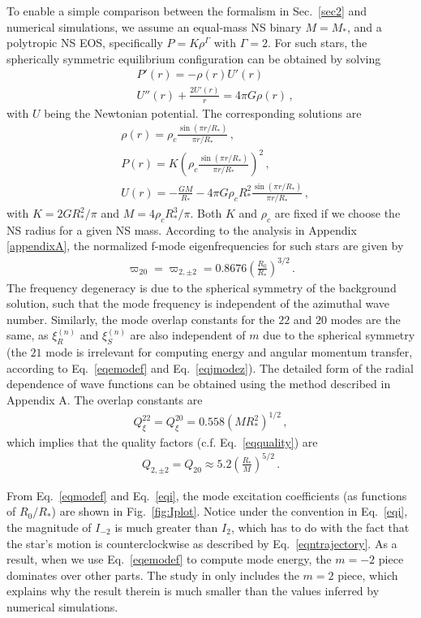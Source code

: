 \documentclass[prd,aps,floatfix,superscriptaddress,nofootinbib,twocolumn,10pt,English]{revtex4}
\begin{document}
To enable a simple comparison between the formalism in Sec.~\ref{sec2} and numerical simulations, we assume an equal-mass NS binary $M=M_*$, and a polytropic NS EOS, specifically $P =K \rho^{\Gamma}$ with $\Gamma=2$. For such stars, the  spherically symmetric equilibrium configuration can be obtained by solving
\begin{align}
& P'(r) =-\rho(r) U'(r) \nonumber \\
& U''(r)+\frac{2 U'(r)}{r} =4 \pi G \rho(r)\,,
\end{align}
with $U$ being the Newtonian potential.
 The corresponding solutions are
\begin{align}
& \rho(r) = \rho_c \frac{\sin (\pi r/R_*)}{\pi r/R_*} \,,\nonumber \\
& P(r) =K \left (\rho_c \frac{\sin (\pi r/R_*)}{\pi r/R_*} \right )^2 \,, \nonumber \\
& U(r) =-\frac{G M}{R_*} -4\pi G \rho_c R_*^2 \frac{\sin (\pi r/R_*)}{\pi r/R_*}\,,
\end{align}
with $K=2 G R_*^2/\pi$ and $M=4 \rho_c R_*^3/\pi$. Both $K$ and $\rho_c$ are fixed if we choose the NS radius for a given NS mass. According to the analysis in Appendix \ref{appendixA}, the normalized f-mode eigenfrequencies for such stars are given by 
\begin{align}\label{eqmodef}
\varpi_{20}=\varpi_{2,\pm2} = 0.8676 \left( \frac{R_0}{R_*}\right)^{3/2}\,.
\end{align}
The frequency degeneracy is due to the spherical symmetry of the
background solution, such that the mode frequency is independent of
the azimuthal wave number. Similarly, the mode overlap constants for
the $22$ and $20$ modes are the same, as
$\xi^{(n)}_R$ and $\xi^{(n)}_S$ are also independent of $m$ due to the
spherical symmetry (the $21$ mode is irrelevant for computing
energy and angular momentum transfer, according to
Eq.~\eqref{eqemodef} and Eq.~\eqref{eqjmodez}). 
The detailed form of the radial dependence of wave
functions can be obtained using the method described in Appendix
A. The overlap constants are
\begin{align}\label{eqoc}
Q^{22}_{\xi} = Q^{20}_\xi = 0.558 (M R^2_*)^{1/2}\,,
\end{align}
which implies that the quality factors (c.f. Eq.~\eqref{eqquality}) are
\begin{align}\label{eqqn}
Q_{2,\pm 2} =Q_{20}\approx 5.2 \left ( \frac{R_*}{M}\right )^{5/2}\,.
\end{align}

From Eq.~\eqref{eqmodef} and Eq.~\eqref{eqi}, the mode excitation coefficients (as functions of $R_0/R_*$) are shown in Fig.~\ref{fig:Iplot}.
Notice under the convention  in Eq.~\eqref{eqi}, the magnitude of $I_{-2}$ is much greater than $I_{2}$, which has to do with the fact that the star's motion is counterclockwise as described by Eq.~\eqref{eqntrajectory}. As a result, when we use Eq.~\eqref{eqemodef} to compute mode energy, the $m=-2$ piece dominates over other parts. The study in \cite{chirenti2016gravitational} only includes the $m=2$ piece, which explains why the result therein is much smaller than the values inferred by numerical simulations.
\end{document}
